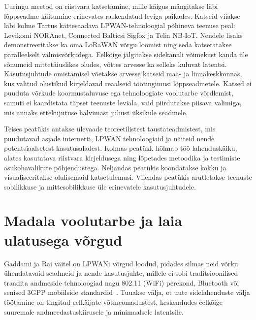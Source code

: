 \documentclass[12pt]{article}
\begin{document}
    Uuringu meetod on riistvara katsetamine, mille käigus mängitakse läbi lõppseadme käitumine erinevates raskendatud leviga paikades.
    Katseid viiakse läbi kolme Tartus kättesaadava LPWAN-tehnoloogial põhineva teenuse peal: Levikomi NORAnet, Connected Balticsi Sigfox ja Telia NB-IoT.
    Nendele lisaks demonstreeritakse ka oma LoRaWAN võrgu loomist ning seda katsetatakse paralleelselt valmisvõrkudega.
    Eelkõige jälgitakse sidekanali võimekust kanda üle sõnumeid mittetäiuslikes oludes, võttes arvesse ka selleks kuluvat latentsi.
    Kasutusjuhtude omistamisel võetakse arvesse katseid maa- ja linnakeskkonnas, kus valitud olustikud kirjeldavad reaalseid töötingimusi lõppseadmetele.
    Katsed ei puuduta võrkude koormustaluvuse ega tehnoloogiate voolutarbe võrdlemist, samuti ei kaardistata täpset teenuste leviala, vaid piirdutakse piisava valimiga, mis annaks ettekujutuse halvimast juhust üksikule seadmele.

    Teises peatükis antakse ülevaade teoreetilistest taustateadmistest, mis puudutavad asjade internetti, LPWAN tehnoloogiaid ja näiteid nende potentsiaalsetest kasutusaladest.
    Kolmas peatükk hõlmab töö lahenduskäiku, alates kasutatava riistvara kirjeldusega ning lõpetades metoodika ja testimiste asukohavalikute põhjendustega.
    Neljandas peatükis koondatakse kokku ja visualiseeritakse olulisemaid katsetulemusi.
    Viiendas peatükis arutletakse teenuste sobilikkuse ja mittesobilikkuse üle erinevatele kasutusjuhtudele.

    \newpage
    \section{Madala voolutarbe ja laia ulatusega võrgud}

    Gaddami ja Rai väitel on LPWANi võrgud loodud, pidades silmas neid võrku ühendatavaid seadmeid ja nende kasutusjuhte, millele ei sobi traditsioonilised traadita andmeside tehnoloogiad nagu 802.11 (WiFi) perekond, Bluetooth või senised 3GPP mobiilside standardid~\cite{gaddam2018comparative}.
    Tuuakse välja, et uute sidelahenduste välja töötamine on tingitud eelkäijate võtmeomadustest, keskendudes eelkõige  suuremale andmeedastuskiirusele ja minimaalsele latentsile.
\end{document}
